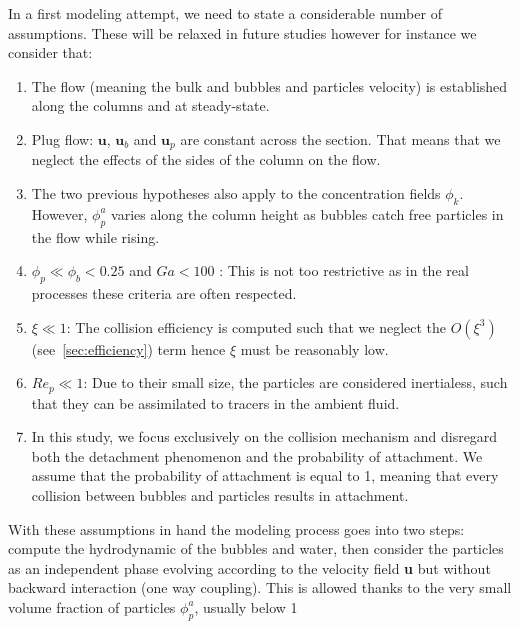In a first modeling attempt, we need to state a considerable number of assumptions. 
These will be relaxed in future studies however for instance we consider that:
\begin{enumerate}
    \item The flow (meaning the bulk and bubbles and particles velocity) is established along the columns and at steady-state.
    \item Plug flow: $\textbf{u}$, $\textbf{u}_b$ and $\textbf{u}_p$ are constant across the section. That means that we neglect the effects of the sides of the column on the flow.
    \item The two previous hypotheses also apply to the concentration fields $\phi_k$. 
    However, $\phi^a_p$ varies along the column height as bubbles catch free particles in the flow while rising. 
    \item $\phi_p\ll \phi_b<0.25$ and $Ga<100$ : This is not too restrictive as in the real processes these criteria are often respected. 
    \item $\xi \ll 1$: The collision efficiency is computed such that we neglect the $O(\xi^3)$ (see~\ref{sec:efficiency}) term hence $\xi$ must be reasonably low. 
    \item $Re_p\ll 1$: Due to their small size, the particles are considered inertialess, such that they can be assimilated to tracers in the ambient fluid. 
    \item In this study, we focus exclusively on the collision mechanism and disregard both the detachment phenomenon and the probability of attachment. 
    We assume that the probability of attachment is equal to 1, meaning that every collision between bubbles and particles results in attachment.
\end{enumerate}

With these assumptions in hand the modeling process goes into two steps: compute the hydrodynamic of the bubbles and water, then consider the particles as an independent phase evolving according to the velocity field \textbf{u} but without backward interaction (one way coupling). 
This is allowed thanks to the very small volume fraction of particles $\phi_p^a$, usually below 1~\textperthousand{}

